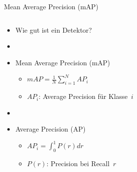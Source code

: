 \documentclass{beamer}
\begin{document}
\begin{frame}{Mean Average Precision (mAP)}
    \begin{columns}
        \begin{column}{0.6\textwidth}
            \begin{itemize}
                \item Wie gut ist ein Detektor?~\cite{everingham2010pascal,lin2014microsoft}
                \item[]
                \item<2-> Mean Average Precision (mAP)
                      \begin{itemize}
                          \item $mAP = \frac{1}{N} \sum_{i=1}^{N} AP_i$
                          \item $AP_i$: Average Precision für Klasse~$i$
                      \end{itemize}
                \item<2->[]
                \item<3-> Average Precision (AP)
                      \begin{itemize}
                          \item $AP_i = \int_0^1 P(r) dr$
                          \item $P(r)$: Precision bei Recall~$r$
                      \end{itemize}
            \end{itemize}
        \end{column}
        \begin{column}{0.4\textwidth}
            \begin{figure}
                \centering
            \end{figure}
        \end{column}
    \end{columns}
\end{frame}
\end{document}
